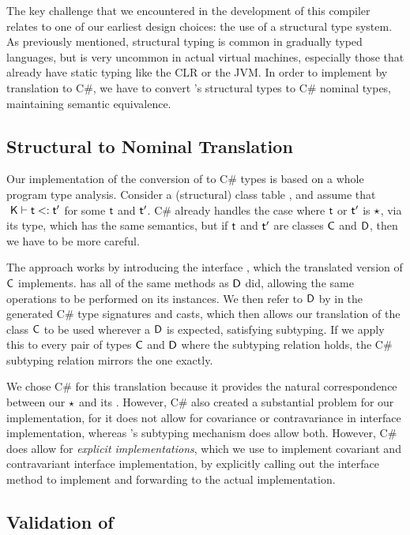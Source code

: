 \documentclass[acmlarge, anonymous, authordraft]{acmart}
\begin{document}
The key challenge that we encountered in the development of this compiler
relates to one of our earliest design choices: the use of a structural type
system. As previously mentioned, structural typing is common in gradually
typed languages, but is very uncommon in actual virtual machines, especially
those that already have static typing like the CLR or the JVM. In order to
implement \kafka by translation to C\#, we have to convert \kafka's structural
types to C\# nominal types, maintaining semantic equivalence.

\subsection{Structural to Nominal Translation} Our implementation of the
conversion of \kafka to C\# types is based on a whole program type analysis.
Consider a (structural) class table \K, and assume that $\StrSub{}\K\t\tp$ for
some $\t$ and $\tp$. C\# already handles the case where $\t$ or $\tp$ is
$\star$, via its  type, which has the same semantics, but if $\t$
and $\tp$ are classes ${\sf{C}}$ and ${\sf{D}}$, then we have to be more careful.

The approach works by introducing the interface , which the translated
version of ${\sf{C}}$ implements.  has all of the same methods as ${\sf{D}}$ did,
allowing the same operations to be performed on its instances. We then refer
to ${\sf{D}}$ by  in the generated C\# type signatures and casts, which then
allows our translation of the class ${\sf{C}}$ to be used wherever a ${\sf{D}}$ is
expected, satisfying subtyping. If we apply this to every pair of types ${\sf{C}}$
and ${\sf{D}}$ where the subtyping relation holds, the C\# subtyping relation
mirrors the \kafka one exactly.

We chose C\# for this translation because it provides the natural
correspondence between our $\star$ and its . However, C\# also
created a substantial problem for our implementation, for it does not allow
for covariance or contravariance in interface implementation, whereas \kafka's
subtyping mechanism does allow both. However, C\# does allow for
\emph{explicit implementations}, which we use to implement covariant and
contravariant interface implementation, by explicitly calling out the
interface method to implement and forwarding to the actual implementation.

\subsection{Validation of \kafka}
\end{document}
